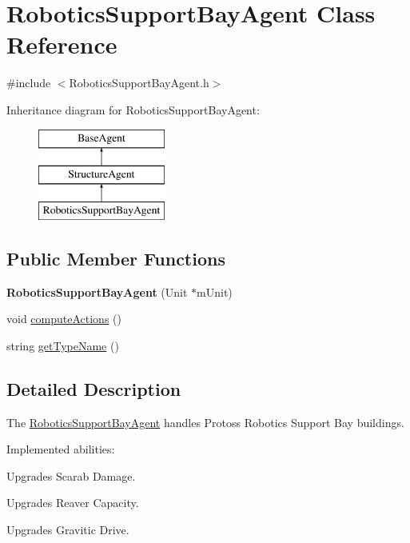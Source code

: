 \hypertarget{class_robotics_support_bay_agent}{
\section{RoboticsSupportBayAgent Class Reference}
\label{class_robotics_support_bay_agent}
}


{\ttfamily \#include $<$RoboticsSupportBayAgent.h$>$}

Inheritance diagram for RoboticsSupportBayAgent:\begin{figure}[H]
\begin{center}
\leavevmode
\includegraphics[height=3.000000cm]{class_robotics_support_bay_agent}
\end{center}
\end{figure}
\subsection*{Public Member Functions}
\begin{DoxyCompactItemize}
\item 
\hypertarget{class_robotics_support_bay_agent_aed6c8f688d1fcd4bce1dad26f006e92a}{
{\bfseries RoboticsSupportBayAgent} (Unit $\ast$mUnit)}
\label{class_robotics_support_bay_agent_aed6c8f688d1fcd4bce1dad26f006e92a}

\item 
void \hyperlink{class_robotics_support_bay_agent_ade078c36ea25789aae939fc69e588e99}{computeActions} ()
\item 
string \hyperlink{class_robotics_support_bay_agent_aee46932b3d6cfb202f91f38d13854f18}{getTypeName} ()
\end{DoxyCompactItemize}


\subsection{Detailed Description}
The \hyperlink{class_robotics_support_bay_agent}{RoboticsSupportBayAgent} handles Protoss Robotics Support Bay buildings.

Implemented abilities:
\begin{DoxyItemize}
\item Upgrades Scarab Damage.
\item Upgrades Reaver Capacity.
\item Upgrades Gravitic Drive.
\end{DoxyItemize}

